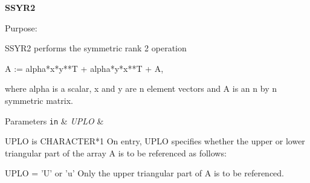 {\bfseries S\+S\+Y\+R2} 

\begin{DoxyParagraph}{Purpose\+: }
\begin{DoxyVerb} SSYR2  performs the symmetric rank 2 operation

    A := alpha*x*y**T + alpha*y*x**T + A,

 where alpha is a scalar, x and y are n element vectors and A is an n
 by n symmetric matrix.\end{DoxyVerb}
 
\end{DoxyParagraph}

\begin{DoxyParams}[1]{Parameters}
\mbox{\tt in}  & {\em U\+P\+L\+O} & \begin{DoxyVerb}          UPLO is CHARACTER*1
           On entry, UPLO specifies whether the upper or lower
           triangular part of the array A is to be referenced as
           follows:

              UPLO = 'U' or 'u'   Only the upper triangular part of A
                                  is to be referenced.


\end{DoxyVerb}
\end{DoxyParams}
